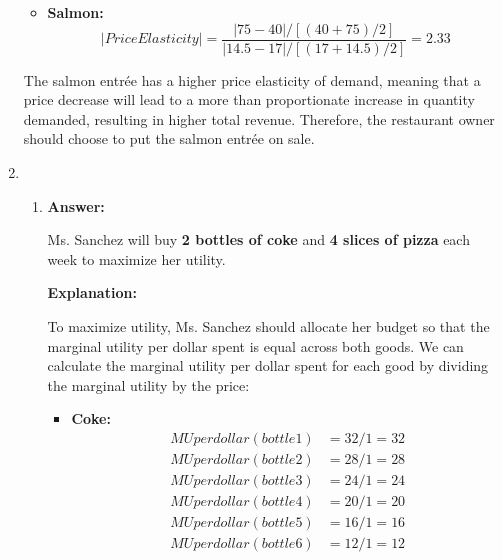\documentclass{article}
\begin{document}
\begin{enumerate}
\begin{itemize}
              \item \textbf{Salmon:}
                    \begin{equation*}
                        |Price Elasticity| = \frac{|75 - 40| / [(40 + 75) / 2]}{|14.5 - 17| / [(17 + 14.5) / 2]} = 2.33
                    \end{equation*}
          \end{itemize}

          The salmon entr\'ee has a higher price elasticity of demand, meaning that a price decrease will lead to a more than proportionate increase in quantity demanded, resulting in higher total revenue. Therefore, the restaurant owner should choose to put the salmon entr\'ee on sale.

    \item
          \begin{enumerate}
              \item \textbf{Answer:}

                    Ms. Sanchez will buy \textbf{2 bottles of coke} and \textbf{4 slices of pizza} each week to maximize her utility.

                    \textbf{Explanation:}

                    To maximize utility, Ms. Sanchez should allocate her budget so that the marginal utility per dollar spent is equal across both goods. We can calculate the marginal utility per dollar spent for each good by dividing the marginal utility by the price:

                    \begin{itemize}
                        \item \textbf{Coke:}
                              \begin{align*}
                                  MU per dollar (bottle 1) & = 32 / 1 = 32 \\
                                  MU per dollar (bottle 2) & = 28 / 1 = 28 \\
                                  MU per dollar (bottle 3) & = 24 / 1 = 24 \\
                                  MU per dollar (bottle 4) & = 20 / 1 = 20 \\
                                  MU per dollar (bottle 5) & = 16 / 1 = 16 \\
                                  MU per dollar (bottle 6) & = 12 / 1 = 12
                              \end{align*}


\end{itemize}
\end{enumerate}
\end{enumerate}
\end{document}
